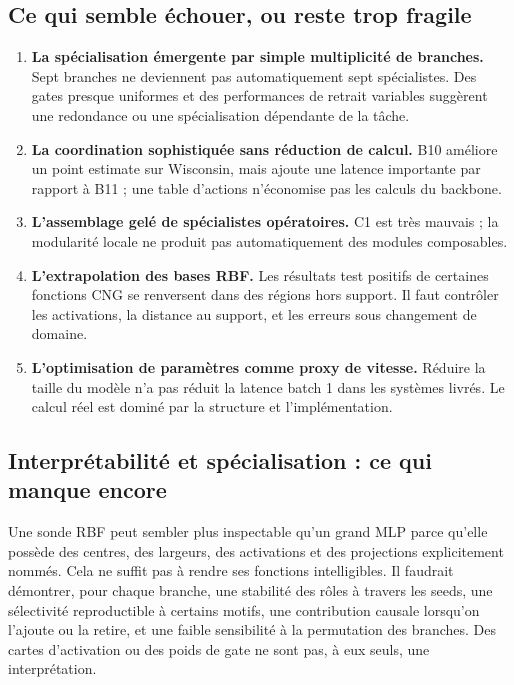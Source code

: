 \documentclass[11pt,a4paper]{article}
\begin{document}
\subsection{Ce qui semble échouer, ou reste trop fragile}

\begin{enumerate}
  \item \textbf{La spécialisation émergente par simple multiplicité de branches.} Sept branches ne deviennent pas automatiquement sept spécialistes. Des gates presque uniformes et des performances de retrait variables suggèrent une redondance ou une spécialisation dépendante de la tâche.
  \item \textbf{La coordination sophistiquée sans réduction de calcul.} B10 améliore un point estimate sur Wisconsin, mais ajoute une latence importante par rapport à B11 ; une table d'actions n'économise pas les calculs du backbone.
  \item \textbf{L'assemblage gelé de spécialistes opératoires.} C1 est très mauvais ; la modularité locale ne produit pas automatiquement des modules composables.
  \item \textbf{L'extrapolation des bases RBF.} Les résultats test positifs de certaines fonctions CNG se renversent dans des régions hors support. Il faut contrôler les activations, la distance au support, et les erreurs sous changement de domaine.
  \item \textbf{L'optimisation de paramètres comme proxy de vitesse.} Réduire la taille du modèle n'a pas réduit la latence batch 1 dans les systèmes livrés. Le calcul réel est dominé par la structure et l'implémentation.
\end{enumerate}

\subsection{Interprétabilité et spécialisation : ce qui manque encore}

Une sonde RBF peut sembler plus inspectable qu'un grand MLP parce qu'elle possède des centres, des largeurs, des activations et des projections explicitement nommés. Cela ne suffit pas à rendre ses fonctions intelligibles. Il faudrait démontrer, pour chaque branche, une stabilité des rôles à travers les seeds, une sélectivité reproductible à certains motifs, une contribution causale lorsqu'on l'ajoute ou la retire, et une faible sensibilité à la permutation des branches. Des cartes d'activation ou des poids de gate ne sont pas, à eux seuls, une interprétation.
\end{document}
